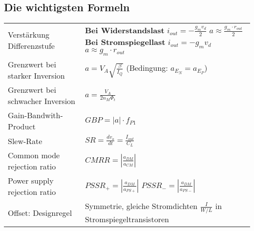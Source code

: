 \subsection{Die wichtigsten Formeln}
\begin{tabular}{p{7cm}p{11cm}}
Verstärkung Differenzstufe &
\textbf{Bei Widerstandslast} $i_{out}=-\frac{g_mv_d}{2}$
$a\approx\frac{g_m\cdot r_{out}}{2}$ \newline
\textbf{Bei Stromspiegellast} $i_{out}=-g_mv_d$ $a\approx g_m\cdot r_{out}$
\\
Grenzwert bei starker Inversion & $a=V_A\sqrt{\frac{\beta}{I_Q}}$ (Bedingung:
$a_{E_N}=a_{E_P}$)\\
Grenzwert bei schwacher Inversion & $a=\frac{V_A}{2n_M\Phi_t}$\\
Gain-Bandwith-Product & $GBP=|a|\cdot f_{P1}$ \\
Slew-Rate & $SR=\frac{dv_o}{dt}=\frac{I_{out}}{C_L}$ \\
Common mode rejection ratio & $CMRR=\left| \frac{a_{DM}}{a_{CM}}\right|$\\
Power supply rejection ratio &
$PSSR_+ = \left| \frac{a_{DM}}{a_{PS+}}\right|$ \newline
$PSSR_- = \left| \frac{a_{DM}}{a_{PS-}}\right|$ \\
Offset: Designregel & Symmetrie, gleiche Stromdichten $\frac{I}{W/L}$ in
Stromspiegeltransistoren\\
\end{tabular}
